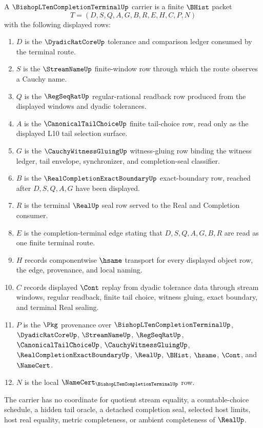 \begin{definition}
\label{def:bishop-l10-completion-terminal-carrier}
A $\BishopLTenCompletionTerminalUp$ carrier is a finite $\BHist$ packet
$$
T=(D,S,Q,A,G,B,R,E,H,C,P,N)
$$
with the following displayed rows:
\begin{enumerate}
\item $D$ is the $\DyadicRatCoreUp$ tolerance and comparison ledger consumed by the terminal route.
\item $S$ is the $\StreamNameUp$ finite-window row through which the route observes a Cauchy name.
\item $Q$ is the $\RegSeqRatUp$ regular-rational readback row produced from the displayed windows and dyadic tolerances.
\item $A$ is the $\CanonicalTailChoiceUp$ finite tail-choice row, read only as the displayed L10 tail selection surface.
\item $G$ is the $\CauchyWitnessGluingUp$ witness-gluing row binding the witness ledger, tail envelope, synchronizer, and completion-seal classifier.
\item $B$ is the $\RealCompletionExactBoundaryUp$ exact-boundary row, reached after $D,S,Q,A,G$ have been displayed.
\item $R$ is the terminal $\RealUp$ seal row served to the Real and Completion consumer.
\item $E$ is the completion-terminal edge stating that $D,S,Q,A,G,B,R$ are read as one finite terminal route.
\item $H$ records componentwise $\hsame$ transport for every displayed object row, the edge, provenance, and local naming.
\item $C$ records displayed $\Cont$ replay from dyadic tolerance data through stream windows, regular readback, finite tail choice, witness gluing, exact boundary, and terminal Real sealing.
\item $P$ is the $\Pkg$ provenance over $\BishopLTenCompletionTerminalUp$, $\DyadicRatCoreUp$, $\StreamNameUp$, $\RegSeqRatUp$, $\CanonicalTailChoiceUp$, $\CauchyWitnessGluingUp$, $\RealCompletionExactBoundaryUp$, $\RealUp$, $\BHist$, $\hsame$, $\Cont$, and $\NameCert$.
\item $N$ is the local $\NameCert_{\BishopLTenCompletionTerminalUp}$ row.
\end{enumerate}
The carrier has no coordinate for quotient stream equality, a countable-choice schedule, a hidden tail oracle, a detached completion seal, selected host limits, host real equality, metric completeness, or ambient completeness of $\RealUp$.
\end{definition}

